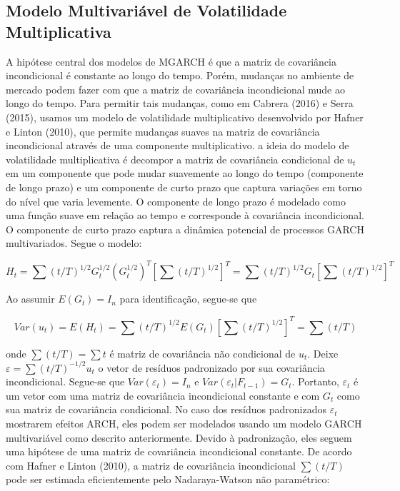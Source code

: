 	
	 \subsection{Modelo Multivariável de Volatilidade Multiplicativa}	
	
	A hipótese central dos modelos de MGARCH é que a matriz de covariância incondicional é constante ao longo do tempo. Porém, mudanças no ambiente de mercado  podem fazer com que a matriz de covariância incondicional mude ao longo do tempo. Para permitir tais mudanças, como em Cabrera (2016) e Serra (2015),  usamos  um modelo de volatilidade multiplicativo desenvolvido por Hafner e Linton (2010), que permite mudanças suaves na matriz de covariância incondicional através de uma componente multiplicativo. a ideia do modelo de volatilidade multiplicativa é decompor a matriz de covariância condicional de $u_t$ em um componente que pode mudar suavemente ao longo do tempo (componente de longo prazo) e um componente  de curto prazo que captura variações em torno do nível que varia levemente. O componente de longo prazo é modelado como uma função suave em relação ao tempo e corresponde à covariância incondicional. O componente de curto prazo captura a dinâmica potencial de processos GARCH multivariados. Segue o modelo:
	
	\begin{equation}
	H_t=\sum (t/T)^{1/2} G_t^ {1/2} (G_t^{1/2})^T [\sum (t/T)^{1/2}]^T=\sum (t/T)^{1/2} G_t[\sum(t/T)^{1/2}]^T
	\end{equation}
	
	Ao assumir $E (G_t) = I_n$ para identificação, segue-se que
 	
 	\begin{equation}
 	Var(u_t)= E(H_t)= \sum (t/T)^{1/2} E(G_t)[\sum (t/T)^{1/2}]^T=\sum (t/T)
 	\end{equation}
 	
 	onde $\sum (t/T)=\sum{t}$ é matriz de covariância não condicional de $u_t$. Deixe $\varepsilon=\sum (t/T)^{-1/2}u_t$  o vetor de resíduos padronizado por sua covariância incondicional. Segue-se que $Var (\varepsilon_t) = I_n$ e $Var (\varepsilon_t | F_{t - 1}) = G_t$. Portanto, $\varepsilon_t$ é um vetor com uma matriz de covariância incondicional constante e com $G_t$ como sua matriz de covariância condicional. No caso dos resíduos padronizados $\varepsilon_t$ mostrarem efeitos ARCH, eles podem ser modelados usando um modelo GARCH multivariável como descrito anteriormente. Devido à padronização, eles seguem uma hipótese de uma matriz de covariância incondicional constante. De acordo com Hafner e Linton (2010), a matriz de covariância incondicional $\sum (t/T)$ pode ser estimada eficientemente pelo Nadaraya-Watson não paramétrico:
 	
